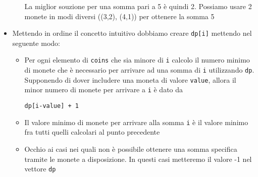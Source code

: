 \begin{itemize}
\begin{itemize}
\begin{center}

			            La miglior souzione per una somma pari a 5 è quindi 2. Possiamo usare 2 monete in modi diversi ((3,2), (4,1)) per ottenere la somma 5
		            \end{center}
	      \end{itemize}
	\item Mettendo in ordine il concetto intuitivo dobbiamo creare \verb|dp[i]| mettendo nel seguente modo:
	      \begin{itemize}
		      \item Per ogni elemento di \verb|coins| che sia minore di \verb|i| calcolo il numero minimo di monete che è necessario per arrivare ad una somma di \verb|i| utilizzando \verb|dp|. Supponendo di dover includere una moneta di valore \verb|value|, allora il minor numero di monete per arrivare a \verb|i| è dato da
		            \begin{center}
			            \verb|dp[i-value] + 1|
		            \end{center}
		      \item Il valore minimo di monete per arrivare alla somma \verb|i| è il valore minimo fra tutti quelli calcolari al punto precedente
		      \item Occhio ai casi nei quali non è possibile ottenere una somma specifica tramite le monete a disposizione. In questi casi metteremo il valore -1 nel vettore \verb|dp|
	      \end{itemize}
\end{itemize}

